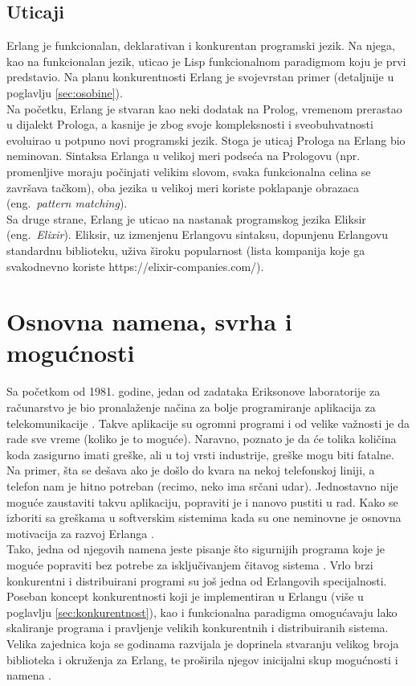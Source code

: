 \documentclass[a4paper]{article}
\begin{document}
{\subsection{Uticaji}
\label{subsec:uticaji}
Erlang je funkcionalan, deklarativan i konkurentan programski jezik.
Na njega, kao na funkcionalan jezik, uticao je Lisp funkcionalnom paradigmom koju je 
prvi predstavio. Na planu konkurentnosti Erlang je svojevrstan primer (detaljnije u poglavlju \ref{sec:osobine}). \\ 

Na početku, Erlang je stvaran kao neki dodatak na Prolog, vremenom prerastao u 
dijalekt Prologa, a kasnije je zbog svoje kompleksnosti i sveobuhvatnosti evoluirao
u potpuno novi programski jezik. Stoga je uticaj Prologa na Erlang bio 
neminovan. Sintaksa Erlanga u velikoj meri podseća na Prologovu 
(npr. promenljive moraju počinjati velikim slovom, 
svaka funkcionalna celina se završava tačkom), oba jezika u velikoj meri koriste poklapanje obrazaca
(eng.~{\em pattern matching}). \\

Sa druge strane, Erlang je uticao na nastanak programskog jezika Eliksir (eng.~{\em Elixir}). Eliksir,
uz izmenjenu Erlangovu sintaksu, dopunjenu Erlangovu standardnu biblioteku, uživa široku popularnost (lista kompanija koje ga svakodnevno koriste https://elixir-companies.com/). 

\section{Osnovna namena, svrha i mogućnosti}
\label{sec:namena}
Sa početkom od 1981. godine, jedan od zadataka Eriksonove laboratorije za računarstvo je bio pronalaženje načina za bolje programiranje aplikacija
za telekomunikacije \cite{phdthesis}. Takve aplikacije su ogromni programi i od velike važnosti je da rade sve vreme (koliko je to moguće). 
Naravno, poznato je da će tolika količina koda zasigurno imati greške, ali u toj vrsti industrije, greške mogu biti fatalne. Na primer, 
šta se dešava ako je došlo do kvara na nekoj telefonskoj liniji, a telefon nam je hitno potreban (recimo, neko ima srčani udar).
Jednostavno nije moguće zaustaviti takvu aplikaciju, popraviti je i nanovo pustiti u rad.
Kako se izboriti sa greškama u softverskim sistemima kada su one neminovne je osnovna motivacija za razvoj Erlanga \cite{phdthesis}. \\

Tako, jedna od njegovih namena jeste pisanje što sigurnijih programa koje je moguće popraviti bez potrebe za isključivanjem čitavog sistema \cite{book_joe}.
Vrlo brzi konkurentni i distribuirani programi su još jedna od Erlangovih specijalnosti. 
Poseban koncept konkurentnosti koji je implementiran u Erlangu (više u poglavlju \ref{sec:konkurentnost}), kao i funkcionalna paradigma 
omogućavaju lako skaliranje programa i pravljenje velikih konkurentnih i distribuiranih sistema.
Velika zajednica koja se godinama razvijala je doprinela stvaranju velikog broja biblioteka i okruženja za Erlang, te proširila njegov 
inicijalni skup mogućnosti i namena \cite{book_joe}. 


}
\end{document}
